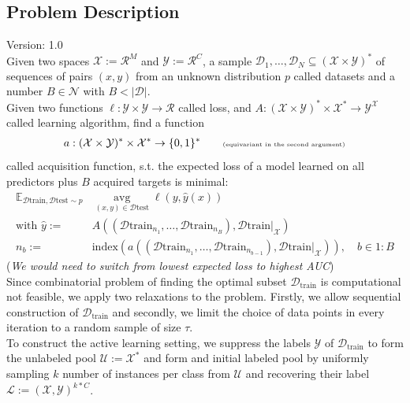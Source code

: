 \documentclass[]{article}
\begin{document}
\subsection{Problem Description}
{\color{red} Version: 1.0}\\
Given two spaces $\mathcal{X}:=\mathcal{R}^M$ and $\mathcal{Y}:=\mathcal{R}^C$, a sample $\mathcal{D}_1,\ldots,\mathcal{D}_N \subseteq (\mathcal{X}\times \mathcal{Y})^*$ of sequences of pairs $(x,y)$  from an unknown distribution $p$ called datasets and a number $B\in\mathcal{N}$ with $B < |\mathcal{D}|$. \\
Given two functions $\ell:\mathcal{Y}\times \mathcal{Y}\rightarrow \mathcal{R}$ called loss, and $A: (\mathcal{X} \times \mathcal{Y})^* \times \mathcal{X}^* \rightarrow \mathcal{Y}^{\mathcal{X}}$ called learning algorithm, find a function
\begin{align*}
	a: (\mathcal{X}\times \mathcal{Y})^* \times \mathcal{X}^* \rightarrow \{0,1\}^*
	\quad\quad \text{\tiny (equivariant in the second argument)}
\end{align*}
called acquisition function, s.t. the expected loss of a model learned on all predictors plus $B$ acquired targets is minimal:
\begin{align*}
	\mathbb{E}_{\mathcal{D}\text{train},\mathcal{D}\text{test}\sim p}   &
	\operatorname{avg}\limits_{(x,y)\in\mathcal{D}\text{test}}
	\ell(y, \hat y(x)) 
	\\
	\text{with }
	\hat y:= & A( (\mathcal{D}\text{train}_{n_1},\ldots,\mathcal{D}\text{train}_{n_B}), \mathcal{D}\text{train}|_{\mathcal{X}})
	\\ 
	n_b := & \text{index}( a( (\mathcal{D}\text{train}_{n_1},\ldots,\mathcal{D}\text{train}_{n_{b-1}}), \mathcal{D}\text{train}|_{\mathcal{X}}) ),
	\quad b\in 1{:}B
\end{align*}
(\textit{We would need to switch from lowest expected loss to highest AUC}) \\
Since combinatorial problem of finding the optimal subset $\mathcal{D}_\text{train}$ is computational not feasible, we apply two relaxations to the problem. 
Firstly, we allow sequential construction of $\mathcal{D}_\text{train}$ and secondly, we limit the choice of data points in every iteration to a random sample of size $\tau$. \\ [2mm]
%
To construct the active learning setting, we suppress the labels $\mathcal{Y}$ of $\mathcal{D}_\text{train}$ to form the unlabeled pool $\mathcal{U} := \mathcal{X}^*$ and form and initial labeled pool by uniformly sampling $k$ number of instances per class from $\mathcal{U}$ and recovering their label $\mathcal{L} := (\mathcal{X}, \mathcal{Y})^{k*C}$. \\ [2mm]
\end{document}
